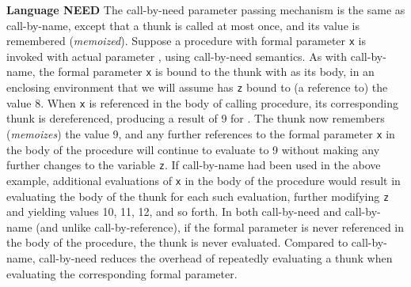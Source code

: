 \begin{minipage}[t]{\sw}
\slidenumber
\LARGE
{\bf Language NEED}\exx
The call-by-need parameter passing mechanism
is the same as call-by-name,
except that a thunk is called at most once,
and its value is remembered ({\em memoized}).\exx
Suppose a procedure with formal parameter \verb'x' is invoked
with actual parameter ,
using call-by-need semantics.
As with call-by-name, the formal parameter \verb'x' is bound to the thunk
with  as its body,
in an enclosing environment
that we will assume has \verb'z' bound to (a reference to) the value 8.
When \verb'x' is referenced in the body of calling procedure,
its corresponding thunk is dereferenced,
producing a result of 9 for .
The thunk now remembers ({\em memoizes}) the value 9,
and any further references to the formal parameter \verb'x'
in the body of the procedure will continue to evaluate to 9
without making any further changes to the variable \verb'z'.\exx
If call-by-name had been used in the above example,
additional evaluations of \verb'x' in the body of the procedure would result
in evaluating the body of the thunk for each such evaluation,
further modifying \verb'z'
and yielding values 10, 11, 12, and so forth.\exx
In both call-by-need and call-by-name
(and unlike call-by-reference),
if the formal parameter is never referenced
in the body of the procedure, the thunk is never evaluated.
Compared to call-by-name,
call-by-need reduces the overhead of repeatedly evaluating
a thunk when evaluating the corresponding formal parameter.
\end{minipage}
